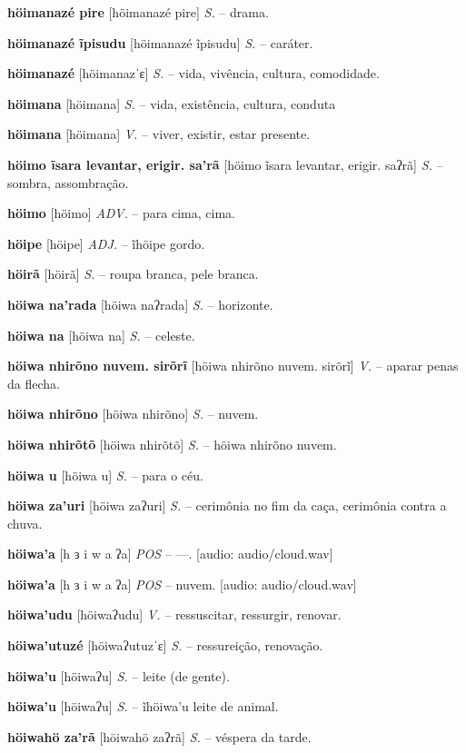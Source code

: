 \textbf{höimanazé pire} [höimanazé pire] \textit{S.} -- drama.

\textbf{höimanazé ĩpisudu} [höimanazé ĩpisudu] \textit{S.} -- caráter.

\textbf{höimanazé} [höimanazˈɛ] \textit{S.} -- vida, vivência, cultura, comodidade.

\textbf{höimana} [höimana] \textit{S.} -- vida, existência, cultura, conduta

\textbf{höimana} [höimana] \textit{V.} -- viver, existir, estar presente.

\textbf{höimo ĩsara levantar, erigir. sa'rã} [höimo ĩsara levantar, erigir. saʔrã] \textit{S.} -- sombra, assombração.

\textbf{höimo} [höimo] \textit{ADV.} -- para cima, cima.

\textbf{höipe} [höipe] \textit{ADJ.} -- ĩhöipe gordo.

\textbf{höirã} [höirã] \textit{S.} -- roupa branca, pele branca.

\textbf{höiwa na'rada} [höiwa naʔrada] \textit{S.} -- horizonte.

\textbf{höiwa na} [höiwa na] \textit{S.} -- celeste.

\textbf{höiwa nhirõno nuvem. sirõrĩ} [höiwa nhirõno nuvem. sirõrĩ] \textit{V.} -- aparar penas da flecha.

\textbf{höiwa nhirõno} [höiwa nhirõno] \textit{S.} -- nuvem.

\textbf{höiwa nhirõtõ} [höiwa nhirõtõ] \textit{S.} -- höiwa nhirõno nuvem.

\textbf{höiwa u} [höiwa u] \textit{S.} -- para o céu.

\textbf{höiwa za'uri} [höiwa zaʔuri] \textit{S.} -- cerimônia no fim da caça, cerimônia contra a chuva.

\textbf{höiwa'a} [h ɜ i w a ʔa] \textit{POS} -- —. [audio: audio/cloud.wav]{\faHeadphones}

\textbf{höiwa'a} [h ɜ i w a ʔa] \textit{POS} -- nuvem. [audio: audio/cloud.wav]{\faHeadphones}

\textbf{höiwa'udu} [höiwaʔudu] \textit{V.} -- ressuscitar, ressurgir, renovar.

\textbf{höiwa'utuzé} [höiwaʔutuzˈɛ] \textit{S.} -- ressureição, renovação.

\textbf{höiwa'u} [höiwaʔu] \textit{S.} -- leite (de gente).

\textbf{höiwa'u} [höiwaʔu] \textit{S.} -- ĩhöiwa'u leite de animal.

\textbf{höiwahö za'rã} [höiwahö zaʔrã] \textit{S.} -- véspera da tarde.

